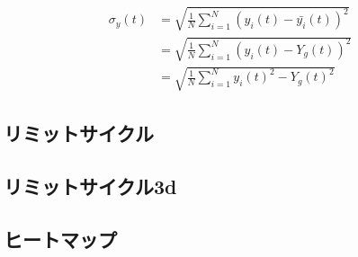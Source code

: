\begin{align}
  \sigma_{y} (t)
  &= \sqrt{\frac{1}{N} \sum_{i=1}^{N} (y_i (t) - \bar{y_i}(t) )^2} \\
  &= \sqrt{\frac{1}{N} \sum_{i=1}^{N} (y_i (t) - Y_g (t) )^2} \\
  &= \sqrt{\frac{1}{N} \sum_{i=1}^{N} {{y_i} (t)}^2 - {{Y_g} (t)}^2}
\end{align}





\subsection{リミットサイクル}




\subsection{リミットサイクル3d}




\subsection{ヒートマップ}




